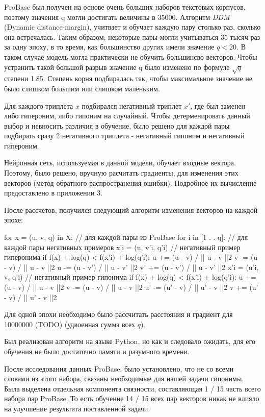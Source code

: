 ProBase был получен на основе очень больших наборов текстовых корпусов, поэтому
значения q могли достигать величины в 35000. Алгоритм \textit{DDM} (Dynamic distance-margin),
учитвает и обучает каждую пару столько раз, сколько она встречалась. Таким образом,
некоторые пары могли учитываться 35 тысяч раз за одну эпоху, в то время, как
большинство других имели значение $q < 20$. В таком случае модель могла практически не
обучить большинсво векторов. Чтобы устранить такой большой разрыв значение q было
изменено по формуле $\sqrt{q}$ степени 1.85. Степень корня подбиралась так, чтобы
максимальное значение не было слишком большим или слишком маленьким.

Для каждого триплета $x$ подбирался негативный триплет $x'$, где был заменен либо
гипероним, либо гипоним на случайный. Чтобы детерменировать данный выбор и
невносить различия в обучение, было решено для каждой пары подбирать сразу 2
негативного триплета - негативный гипоним и негативный гипероним.

Нейронная сеть, используемая в данной модели, обучает входные вектора. Поэтому, было
решено, вручную расчитать градиенты, для изменения этих векторов (метод обратного
распространения ошибки). Подробное их вычисление предоставлено в приложении 3.

После рассчетов, получился следующий алгоритм изменения векторов на каждой эпохе:

for x = (u, v, q) in X: // для каждой пары из ProBase
for i in [1 . . q]: // для каждой пары негативных примеров
x’i = (u, v’i, q’i) // негативный пример гиперонима
if f(x) + log(q) < f(x’i) + log(q’i):
u += (u - v) / || u - v ||2
v -= (u - v) / || u - v ||2
u -= (u - v’) / || u - v’ ||2
v’ += (u - v’) / || u - v’ ||2
x’i = (u’i, v, q’i) // негативный пример гипонима
if f(x) + log(q) < f(x’i) + log(q’i):
u += (u - v) / || u - v ||2
v -= (u - v) / || u - v ||2
u’ -= (u’ - v) / || u’ - v ||2
v += (u’ - v) / || u’ - v ||2

Для одной эпохи необходимо было рассчитать расстояния и градиент для 10000000
(TODO) (удвоенная сумма всех $q$).

Был реализован алгоритм на языке Python, но как и следовало ожидать, для его обучения
не было достаточно памяти и разумного времени.

После исследования данных ProBase, было установлено, что не со всеми словами из этого
набора, связаны необходимые для нашей задачи гипонимы. Была выделена отдельная
компонента связности, составляющая 1 / 15 часть всего набора пар ProBase. То есть
обучение 14 / 15 всех пар векторов никак не влияло на улучшение результата
поставленной задачи.

